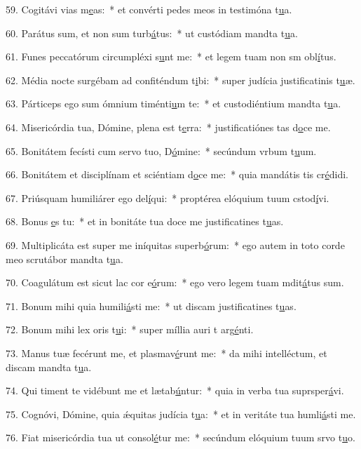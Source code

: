 59. Cogitávi vias m\uline{e}as:~* et convérti pedes meos in testimóna t\uline{u}a.\par 
60. Parátus sum, et non sum turb\uline{á}tus:~* ut custódiam mandta t\uline{u}a.\par 
61. Funes peccatórum circumpléxi s\uline{u}nt me:~* et legem tuam non sm obl\uline{í}tus.\par 
62. Média nocte surgébam ad confiténdum t\uline{i}bi:~* super judícia justificatinis t\uline{u}æ.\par 
63. Párticeps ego sum ómnium timénti\uline{u}m te:~* et custodiéntium mandta t\uline{u}a.\par 
64. Misericórdia tua, Dómine, plena est t\uline{e}rra:~* justificatiónes tas d\uline{o}ce me.\par 
65. Bonitátem fecísti cum servo tuo, D\uline{ó}mine:~* secúndum vrbum t\uline{u}um.\par 
66. Bonitátem et disciplínam et sciéntiam d\uline{o}ce me:~* quia mandátis tis cr\uline{é}didi.\par 
67. Priúsquam humiliárer ego del\uline{í}qui:~* proptérea elóquium tuum cstod\uline{í}vi.\par 
68. Bonus \uline{e}s tu:~* et in bonitáte tua doce me justificatines t\uline{u}as.\par 
69. Multiplicáta est super me iníquitas superb\uline{ó}rum:~* ego autem in toto corde meo scrutábor mandta t\uline{u}a.\par 
70. Coagulátum est sicut lac cor e\uline{ó}rum:~* ego vero legem tuam mdit\uline{á}tus sum.\par 
71. Bonum mihi quia humili\uline{á}sti me:~* ut discam justificatines t\uline{u}as.\par 
72. Bonum mihi lex oris t\uline{u}i:~* super míllia auri t arg\uline{é}nti.\par 
73. Manus tuæ fecérunt me, et plasmav\uline{é}runt me:~* da mihi intelléctum, et discam mandta t\uline{u}a.\par 
74. Qui timent te vidébunt me et lætab\uline{ú}ntur:~* quia in verba tua suprsper\uline{á}vi.\par 
75. Cognóvi, Dómine, quia ǽquitas judícia t\uline{u}a:~* et in veritáte tua humli\uline{á}sti me.\par 
76. Fiat misericórdia tua ut consol\uline{é}tur me:~* secúndum elóquium tuum srvo t\uline{u}o.\par 

